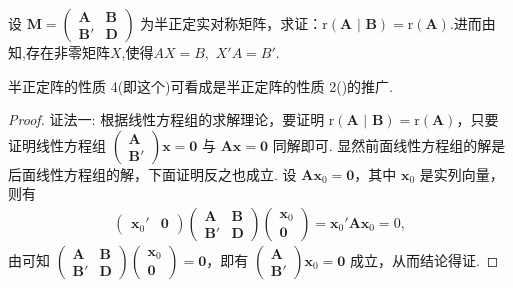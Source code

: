 \documentclass[../../main.tex]{subfiles}%
\begin{document}
\begin{proposition}\label{proposition:例8.75}
设 $\boldsymbol{M}=\begin{pmatrix}
\boldsymbol{A} & \boldsymbol{B} \\
\boldsymbol{B}' & \boldsymbol{D}
\end{pmatrix}$ 为半正定实对称矩阵，求证：$\mathrm{r}\left( \boldsymbol{A}\,\,|\,\,\boldsymbol{B} \right) =\mathrm{r}(\boldsymbol{A})$.进而由知,存在非零矩阵$X$,使得$AX=B,\,\,X'A=B'$.
\end{proposition}
\begin{remark}
半正定阵的性质 4(即这个)可看成是半正定阵的性质 2()的推广. 
\end{remark}
\begin{proof}

{\color{blue}证法一:}
根据线性方程组的求解理论，要证明 $\mathrm{r}\left( \boldsymbol{A}\,\,|\,\,\boldsymbol{B} \right) =\mathrm{r}(\boldsymbol{A})$，只要证明线性方程组 $\begin{pmatrix}
\boldsymbol{A} \\
\boldsymbol{B}'
\end{pmatrix}\boldsymbol{x}=\boldsymbol{0}$ 与 $\boldsymbol{A}\boldsymbol{x}=\boldsymbol{0}$ 同解即可. 显然前面线性方程组的解是后面线性方程组的解，下面证明反之也成立. 设 $\boldsymbol{A}\boldsymbol{x}_0=\boldsymbol{0}$，其中 $\boldsymbol{x}_0$ 是实列向量，则有
\begin{align*}
\begin{pmatrix}
\boldsymbol{x}_0' & \boldsymbol{0}
\end{pmatrix}
\begin{pmatrix}
\boldsymbol{A} & \boldsymbol{B} \\
\boldsymbol{B}' & \boldsymbol{D}
\end{pmatrix}
\begin{pmatrix}
\boldsymbol{x}_0 \\
\boldsymbol{0}
\end{pmatrix}=\boldsymbol{x}_0'\boldsymbol{A}\boldsymbol{x}_0 = 0,
\end{align*}
由可知 $\begin{pmatrix}
\boldsymbol{A} & \boldsymbol{B} \\
\boldsymbol{B}' & \boldsymbol{D}
\end{pmatrix}
\begin{pmatrix}
\boldsymbol{x}_0 \\
\boldsymbol{0}
\end{pmatrix}=\boldsymbol{0}$，即有 $\begin{pmatrix}
\boldsymbol{A} \\
\boldsymbol{B}'
\end{pmatrix}\boldsymbol{x}_0=\boldsymbol{0}$ 成立，从而结论得证.


\end{proof}
\end{document}

